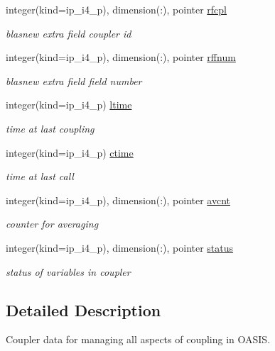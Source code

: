 \begin{DoxyCompactItemize}
integer(kind=ip\+\_\+i4\+\_\+p), dimension(\+:), pointer \hyperlink{structmod__oasis__coupler_1_1prism__coupler__type_a090e6832355f714af2c64d4029c8aea5}{rfcpl}
\begin{DoxyCompactList}\small\item\em blasnew extra field coupler id \end{DoxyCompactList}\item 
integer(kind=ip\+\_\+i4\+\_\+p), dimension(\+:), pointer \hyperlink{structmod__oasis__coupler_1_1prism__coupler__type_a6be4f1b135e027b3ede5c957184e392e}{rffnum}
\begin{DoxyCompactList}\small\item\em blasnew extra field field number \end{DoxyCompactList}\item 
integer(kind=ip\+\_\+i4\+\_\+p) \hyperlink{structmod__oasis__coupler_1_1prism__coupler__type_a5d93a8e5b39d3b713e8f1bf4760b10f9}{ltime}
\begin{DoxyCompactList}\small\item\em time at last coupling \end{DoxyCompactList}\item 
integer(kind=ip\+\_\+i4\+\_\+p) \hyperlink{structmod__oasis__coupler_1_1prism__coupler__type_a2fd551fc7c0ed06d43b2b3babfc8c34a}{ctime}
\begin{DoxyCompactList}\small\item\em time at last call \end{DoxyCompactList}\item 
integer(kind=ip\+\_\+i4\+\_\+p), dimension(\+:), pointer \hyperlink{structmod__oasis__coupler_1_1prism__coupler__type_accd8eb166c6aac75690be947dec43ccc}{avcnt}
\begin{DoxyCompactList}\small\item\em counter for averaging \end{DoxyCompactList}\item 
integer(kind=ip\+\_\+i4\+\_\+p), dimension(\+:), pointer \hyperlink{structmod__oasis__coupler_1_1prism__coupler__type_aee26373fa4a84f3c4e1841ba702f161c}{status}
\begin{DoxyCompactList}\small\item\em status of variables in coupler \end{DoxyCompactList}\end{DoxyCompactItemize}


\subsection{Detailed Description}
Coupler data for managing all aspects of coupling in O\+A\+S\+IS. 

